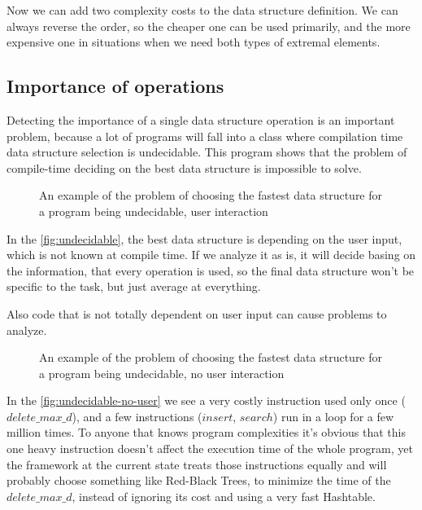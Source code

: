 \documentclass[a4paper,11pt]{article}
\begin{document}
		Now we can add two complexity costs to the data structure definition. We can always reverse the order,
		so the cheaper one can be used primarily, and the more expensive one in situations when we need both
		types of extremal elements.

	\subsection{Importance of operations} \label{sub:importance}

		Detecting the importance of a single data structure operation is an important problem, because a lot of
		programs will fall into a class where compilation time data structure selection is undecidable. This
		program shows that the problem of compile-time deciding on the best data structure is impossible to
		solve.

		\begin{figure}
			

			\caption{An example of the problem of choosing the fastest data structure for a program being
			undecidable, user interaction}

			\label{fig:undecidable}
		\end{figure}

		In the \autoref{fig:undecidable}, the best data structure is depending on the user input, which is not known at
		compile time. If we analyze it as is, it will decide basing on the information, that every operation is
		used, so the final data structure won't be specific to the task, but just average at everything.

		Also code that is not totally dependent on user input can cause problems to analyze.

		\begin{figure}
			

			\caption{An example of the problem of choosing the fastest data structure for a program being
			undecidable, no user interaction}

			\label{fig:undecidable-no-user}
		\end{figure}

		In the \autoref{fig:undecidable-no-user} we see a very costly instruction used only once
		($delete\_max\_d$), and a few instructions ($insert$, $search$) run in a loop for a few million times.
		To anyone that knows program complexities it's obvious that this one heavy instruction doesn't affect
		the execution time of the whole program, yet the framework at the current state treats those
		instructions equally and will probably choose something like Red-Black Trees, to minimize the time of
		the $delete\_max\_d$, instead of ignoring its cost and using a very fast Hashtable.
\end{document}
